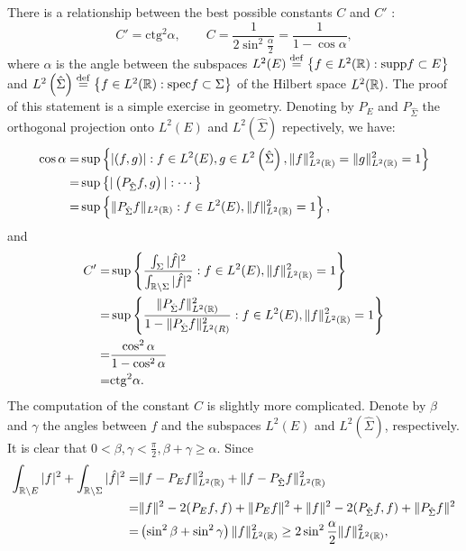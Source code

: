   There is a relationship between the best possible constants  $C$ and $C'$ :
  \[
    C'=\mathrm{ctg}^2\alpha, \qquad C=\frac{1}{2\sin^2 \frac{\alpha}{2}}=\frac{1}{1-\cos\alpha},
  \] 
  where $\alpha$ is the angle between the subspaces $L^2(E)\overset{\mathrm{def}}{=}\left\{ f\in L^2(\mathbb{R}):\mathrm{supp}f \subset  E \right\} $ and $L^2\left( \hat{\Sigma} \right) \overset{\mathrm{def}}{=}\left\{ f\in L^2(\mathbb{R}):\mathrm{spec}f\subset \Sigma \right\} $ of the Hilbert space $L^2(\mathbb{R})$. The proof of this statement is a simple exercise in geometry. Denoting by $P_{E}$ and $P_{\hat{\Sigma}}$ the orthogonal projection onto $L^2(E)$ and $L^2(\hat{\Sigma})$ repectively, we have:
  \begin{equation*}
    \begin{aligned}
      \cos \alpha = & \sup\left\{ |(f,g)|:f\in L^2(E),g\in L^2\left( \hat{\Sigma} \right), \|f\|^2_{L^2(\mathbb{R})}=\|g\|^2_{L^2(\mathbb{R})}=1  \right\}\\
      = & \sup\left\{ |\left( P_{\hat{\Sigma}}f,g \right) |:\cdots \right\} \\
      = & \sup\left\{ \|P_{\hat{\Sigma}}f\|_{L^2(\mathbb{R})}:f\in L^2(E),\|f\|^2_{L^2(\mathbb{R})}=1 \right\}, 
    \end{aligned}
  \end{equation*}
  and
  \begin{equation*}
    \begin{aligned}
      C' = & \sup\left\{ \frac{\int_{\Sigma}|\hat{f}|^2}{\int_{\mathbb{R}\backslash \Sigma}|\hat{f}|^2}:f\in L^2(E),\|f\|^2_{L^2(\mathbb{R})}=1 \right\} \\
      = & \sup \left\{ \frac{\|P_{\hat{\Sigma}}f\|^2_{L^2(\mathbb{R})}}{1-\|P_{\hat{\Sigma}}f\|^2_{L^2(R)}}:f\in L^2(E), \|f\|^2_{L^2(\mathbb{R})}=1 \right\} \\
      = & \frac{\cos^2\alpha}{1-\cos^2\alpha}\\
      = & \mathrm{ctg}^2\alpha.
    \end{aligned}
  \end{equation*}
  The computation of the constant $C$ is slightly more complicated. Denote by $\beta$ and $\gamma$ the angles between $f$ and the subspaces $L^2(E)$ and $L^2\left( \hat{\Sigma} \right) $, respectively. It is clear that $0<\beta,\gamma<\frac{\pi}{2},\beta+\gamma\ge \alpha$. Since 
  \begin{equation*}
    \begin{aligned}
      \int_{\mathbb{R}\backslash E}|f|^2+\int_{\mathbb{R}\backslash \Sigma}|\hat{f}|^2= & \|f-P_Ef\|^2_{L^2(\mathbb{R})}+\|f-P_{\hat{\Sigma}}f\|^2_{L^2(\mathbb{R})}\\
      = & \|f\|^2-2(P_Ef,f)+\|P_Ef\|^2+\|f\|^2-2(P_{\hat{\Sigma}}f,f)+\|P_{\hat{\Sigma}}f\|^2\\
      = & \left( \sin^2\beta+\sin^2\gamma \right) \|f\|^2_{L^2(\mathbb{R})} \ge 2\sin^2 \frac{\alpha}{2}\|f\|^2_{L^2(\mathbb{R})},
    \end{aligned}
  \end{equation*}

